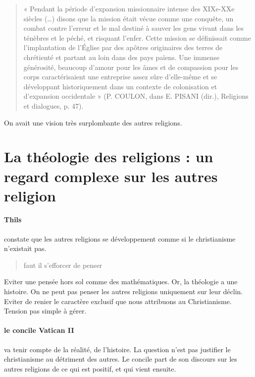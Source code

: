 \begin{quote}
    
« Pendant la période d’expansion missionnaire intense des XIXe-XXe siècles (…) disons que la
mission était vécue comme une conquête, un combat contre l’erreur et le mal destiné à sauver les
gens vivant dans les ténèbres et le péché, et risquant l’enfer. Cette mission se définissait comme 
l’implantation de l’Église par des apôtres originaires des terres de chrétienté et partant au loin dans
des pays païens. Une immense générosité, beaucoup d’amour pour les âmes et de compassion pour
les corps caractérisaient une entreprise assez sûre d’elle-même et se développant historiquement
dans un contexte de colonisation et d’expansion occidentale » (P. COULON, dans E. PISANI
(dir.), Religions et dialogues, p. 47). 
\end{quote}

\begin{Synthesis}
On avait une vision très surplombante des autres religions. 
\end{Synthesis}
\section{La théologie des religions : un regard complexe sur les autres religion}

 
\paragraph{Thils} constate que les autres religions se développement comme si le christianisme n'existait pas. 
\begin{quote}
     faut il s'efforcer de penser

\end{quote}

Eviter une pensée hors sol comme des mathématiques. Or, la théologie a une histoire. On ne peut pas penser les autres religions uniquement sur leur déclin.
Eviter de renier le caractère exclusif que nous attribuons au Christianisme. Tension pas simple à gérer.


\paragraph{le concile Vatican II} va tenir compte de la réalité, de l'histoire. La question n'est pas justifier le christianisme au détriment des autres. Le concile part de son discours sur les autres religions de ce qui est positif, et qui vient ensuite.

